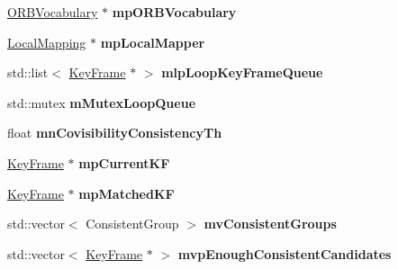 \begin{DoxyCompactItemize}
\item 
\hypertarget{classORB__SLAM2_1_1LoopClosing_ac9d1b37eb70edbc013a431d92a4d86d1}{\hyperlink{classDBoW2_1_1TemplatedVocabulary}{O\-R\-B\-Vocabulary} $\ast$ {\bfseries mp\-O\-R\-B\-Vocabulary}}\label{classORB__SLAM2_1_1LoopClosing_ac9d1b37eb70edbc013a431d92a4d86d1}

\item 
\hypertarget{classORB__SLAM2_1_1LoopClosing_a5eaa1b6d507d9bd138ab0f10a308e3c9}{\hyperlink{classORB__SLAM2_1_1LocalMapping}{Local\-Mapping} $\ast$ {\bfseries mp\-Local\-Mapper}}\label{classORB__SLAM2_1_1LoopClosing_a5eaa1b6d507d9bd138ab0f10a308e3c9}

\item 
\hypertarget{classORB__SLAM2_1_1LoopClosing_a4b5b9bb2ba5e3fe79428e4af9a002025}{std\-::list$<$ \hyperlink{classORB__SLAM2_1_1KeyFrame}{Key\-Frame} $\ast$ $>$ {\bfseries mlp\-Loop\-Key\-Frame\-Queue}}\label{classORB__SLAM2_1_1LoopClosing_a4b5b9bb2ba5e3fe79428e4af9a002025}

\item 
\hypertarget{classORB__SLAM2_1_1LoopClosing_a3c28fbf7b84469cd14b12f511d499533}{std\-::mutex {\bfseries m\-Mutex\-Loop\-Queue}}\label{classORB__SLAM2_1_1LoopClosing_a3c28fbf7b84469cd14b12f511d499533}

\item 
\hypertarget{classORB__SLAM2_1_1LoopClosing_a78c93c677c23ca7bf62a2a9652c008ff}{float {\bfseries mn\-Covisibility\-Consistency\-Th}}\label{classORB__SLAM2_1_1LoopClosing_a78c93c677c23ca7bf62a2a9652c008ff}

\item 
\hypertarget{classORB__SLAM2_1_1LoopClosing_a4b6bc1810ef5921462ebdeee32508118}{\hyperlink{classORB__SLAM2_1_1KeyFrame}{Key\-Frame} $\ast$ {\bfseries mp\-Current\-K\-F}}\label{classORB__SLAM2_1_1LoopClosing_a4b6bc1810ef5921462ebdeee32508118}

\item 
\hypertarget{classORB__SLAM2_1_1LoopClosing_a53d45d3e2f0a8e0c9797079b9ae4ea37}{\hyperlink{classORB__SLAM2_1_1KeyFrame}{Key\-Frame} $\ast$ {\bfseries mp\-Matched\-K\-F}}\label{classORB__SLAM2_1_1LoopClosing_a53d45d3e2f0a8e0c9797079b9ae4ea37}

\item 
\hypertarget{classORB__SLAM2_1_1LoopClosing_aede54de0cb62136859ccb297e890f573}{std\-::vector$<$ Consistent\-Group $>$ {\bfseries mv\-Consistent\-Groups}}\label{classORB__SLAM2_1_1LoopClosing_aede54de0cb62136859ccb297e890f573}

\item 
\hypertarget{classORB__SLAM2_1_1LoopClosing_ac545f793bc68348fea584022d1daa609}{std\-::vector$<$ \hyperlink{classORB__SLAM2_1_1KeyFrame}{Key\-Frame} $\ast$ $>$ {\bfseries mvp\-Enough\-Consistent\-Candidates}}\label{classORB__SLAM2_1_1LoopClosing_ac545f793bc68348fea584022d1daa609}


\end{DoxyCompactItemize}
